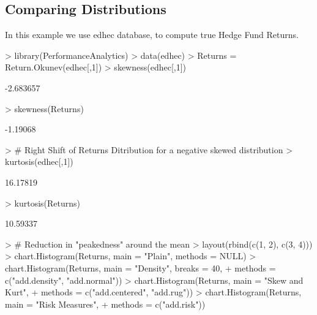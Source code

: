 \documentclass[12pt,letterpaper,english]{article}
\begin{document}
\subsection{Comparing Distributions}

In this example we use edhec database, to compute true Hedge Fund Returns.

\begin{Schunk}
\begin{Sinput}
> library(PerformanceAnalytics)
> data(edhec)
> Returns = Return.Okunev(edhec[,1])
> skewness(edhec[,1])
\end{Sinput}
\begin{Soutput}
[1] -2.683657
\end{Soutput}
\begin{Sinput}
> skewness(Returns)
\end{Sinput}
\begin{Soutput}
[1] -1.19068
\end{Soutput}
\begin{Sinput}
> # Right Shift of Returns Ditribution for a negative skewed distribution 
> kurtosis(edhec[,1])
\end{Sinput}
\begin{Soutput}
[1] 16.17819
\end{Soutput}
\begin{Sinput}
> kurtosis(Returns)
\end{Sinput}
\begin{Soutput}
[1] 10.59337
\end{Soutput}
\begin{Sinput}
> # Reduction in "peakedness" around the mean
> layout(rbind(c(1, 2), c(3, 4)))
>  chart.Histogram(Returns, main = "Plain", methods = NULL)
>  chart.Histogram(Returns, main = "Density", breaks = 40,
+  methods = c("add.density", "add.normal"))
>  chart.Histogram(Returns, main = "Skew and Kurt",
+  methods = c("add.centered", "add.rug"))
> chart.Histogram(Returns, main = "Risk Measures",
+  methods = c("add.risk"))
\end{Sinput}
\end{Schunk}
\end{document}
